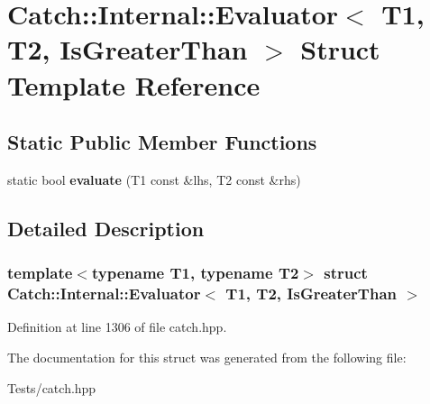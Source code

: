 \hypertarget{struct_catch_1_1_internal_1_1_evaluator_3_01_t1_00_01_t2_00_01_is_greater_than_01_4}{}\section{Catch\+:\+:Internal\+:\+:Evaluator$<$ T1, T2, Is\+Greater\+Than $>$ Struct Template Reference}
\label{struct_catch_1_1_internal_1_1_evaluator_3_01_t1_00_01_t2_00_01_is_greater_than_01_4}
\subsection*{Static Public Member Functions}
\begin{DoxyCompactItemize}
\item 
\mbox{\label{struct_catch_1_1_internal_1_1_evaluator_3_01_t1_00_01_t2_00_01_is_greater_than_01_4_a55745f74f09ac5c61bd3d592ca5560af}} 
static bool {\bfseries evaluate} (T1 const \&lhs, T2 const \&rhs)
\end{DoxyCompactItemize}


\subsection{Detailed Description}
\subsubsection*{template$<$typename T1, typename T2$>$\newline
struct Catch\+::\+Internal\+::\+Evaluator$<$ T1, T2, Is\+Greater\+Than $>$}



Definition at line 1306 of file catch.\+hpp.



The documentation for this struct was generated from the following file\+:\begin{DoxyCompactItemize}
\item 
Tests/catch.\+hpp\end{DoxyCompactItemize}
